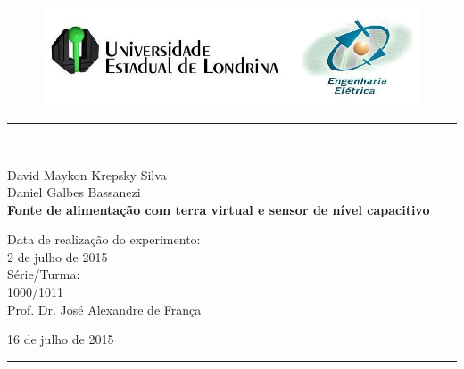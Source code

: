 \begin{titlepage}
\begin{center}
\begin{figure}[h]
\includegraphics[scale=0.76]{img/topdotitulo.png}
\end{figure}
\rule{\columnwidth}{1.5mm}
\

\large David Maykon Krepsky Silva\\
\large Daniel Galbes Bassanezi\\

\vspace{4cm}
{\bf \Large Fonte de alimentação com terra virtual e sensor de nível capacitivo}
\vspace{3.5cm}

\begin{flushright}
Data de realização do experimento:\\
2 de julho de 2015\\
Série/Turma:\\
1000/1011\\
Prof. Dr. José Alexandre de França
\end{flushright}

\vspace{3.2cm}
16 de julho de 2015

\rule{\columnwidth}{1.3mm}
\end{center}
\end{titlepage}
\blankpage